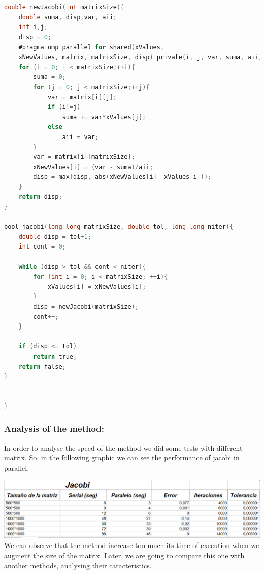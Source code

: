 \documentclass{article}
\begin{document}
\begin{lstlisting}[language=C]


double newJacobi(int matrixSize){
    double suma, disp,var, aii;
    int i,j;
    disp = 0;
    #pragma omp parallel for shared(xValues, 
    xNewValues, matrix, matrixSize, disp) private(i, j, var, suma, aii)
    for (i = 0; i < matrixSize;++i){
        suma = 0;
        for (j = 0; j < matrixSize;++j){
            var = matrix[i][j];
            if (i!=j)
                suma += var*xValues[j];
            else
                aii = var;
        }
        var = matrix[i][matrixSize];
        xNewValues[i] = (var - suma)/aii;
        disp = max(disp, abs(xNewValues[i]- xValues[i]));
    }
    return disp;
}

bool jacobi(long long matrixSize, double tol, long long niter){
    double disp = tol+1;
    int cont = 0;

    while (disp > tol && cont < niter){
        for (int i = 0; i < matrixSize; ++i){
            xValues[i] = xNewValues[i];
        }
        disp = newJacobi(matrixSize);
        cont++;
    }

    if (disp <= tol)
        return true;
    return false;
}


}


\end{lstlisting}


\subsubsection{Analysis of the method:}

In order to analyse the speed of the method we did some tests with different matrix. So, in the following graphic we can see the performance of jacobi in parallel.

\includegraphics[width=\linewidth]{./images/jacobi.PNG}\\

We can observe that the method increase too much its time of execution when we augment the size of the matrix. Later, we are going to compare this one with another methods, analysing their caracteristics.

\newpage
\end{document}
